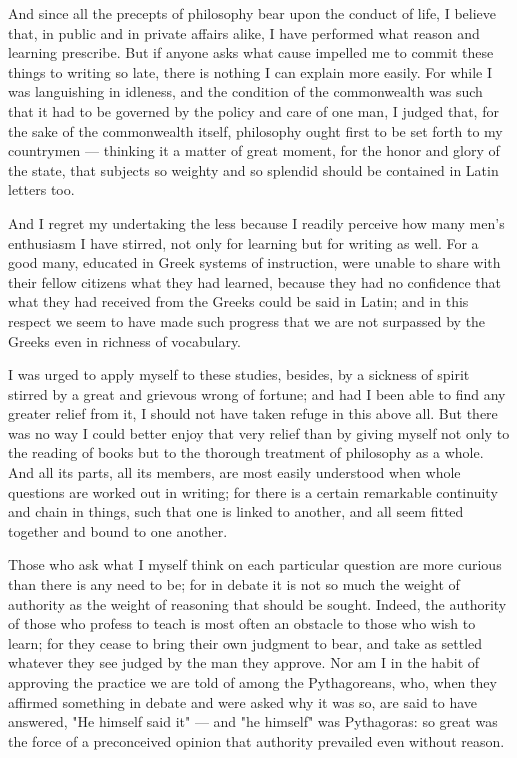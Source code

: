  And since all the precepts of philosophy bear upon the conduct of life, I believe that, in public and in private affairs alike, I have performed what reason and learning prescribe. But if anyone asks what cause impelled me to commit these things to writing so late, there is nothing I can explain more easily. For while I was languishing in idleness, and the condition of the commonwealth was such that it had to be governed by the policy and care of one man, I judged that, for the sake of the commonwealth itself, philosophy ought first to be set forth to my countrymen — thinking it a matter of great moment, for the honor and glory of the state, that subjects so weighty and so splendid should be contained in Latin letters too.

 And I regret my undertaking the less because I readily perceive how many men's enthusiasm I have stirred, not only for learning but for writing as well. For a good many, educated in Greek systems of instruction, were unable to share with their fellow citizens what they had learned, because they had no confidence that what they had received from the Greeks could be said in Latin; and in this respect we seem to have made such progress that we are not surpassed by the Greeks even in richness of vocabulary.

 I was urged to apply myself to these studies, besides, by a sickness of spirit stirred by a great and grievous wrong of fortune; and had I been able to find any greater relief from it, I should not have taken refuge in this above all. But there was no way I could better enjoy that very relief than by giving myself not only to the reading of books but to the thorough treatment of philosophy as a whole. And all its parts, all its members, are most easily understood when whole questions are worked out in writing; for there is a certain remarkable continuity and chain in things, such that one is linked to another, and all seem fitted together and bound to one another.

 Those who ask what I myself think on each particular question are more curious than there is any need to be; for in debate it is not so much the weight of authority as the weight of reasoning that should be sought. Indeed, the authority of those who profess to teach is most often an obstacle to those who wish to learn; for they cease to bring their own judgment to bear, and take as settled whatever they see judged by the man they approve. Nor am I in the habit of approving the practice we are told of among the Pythagoreans, who, when they affirmed something in debate and were asked why it was so, are said to have answered, "He himself said it" — and "he himself" was Pythagoras: so great was the force of a preconceived opinion that authority prevailed even without reason.

